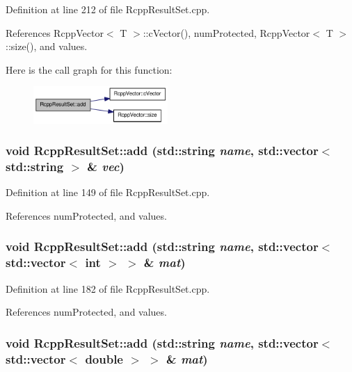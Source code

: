 Definition at line 212 of file RcppResultSet.cpp.

References RcppVector$<$ T $>$::cVector(), numProtected, RcppVector$<$ T $>$::size(), and values.

Here is the call graph for this function:\nopagebreak
\begin{figure}[H]
\begin{center}
\leavevmode
\includegraphics[width=145pt]{classRcppResultSet_a068cb13e27c0e26dd05e92d67eaeb7d0_cgraph}
\end{center}
\end{figure}
\hypertarget{classRcppResultSet_adb4236a049c8dceb7112229f5e68a295}{
\subsubsection[{add}]{\setlength{\rightskip}{0pt plus 5cm}void RcppResultSet::add (std::string {\em name}, \/  std::vector$<$ std::string $>$ \& {\em vec})}}
\label{classRcppResultSet_adb4236a049c8dceb7112229f5e68a295}


Definition at line 149 of file RcppResultSet.cpp.

References numProtected, and values.\hypertarget{classRcppResultSet_ab51f30f4bd5f3c6153221a3bd7bb7e24}{
\subsubsection[{add}]{\setlength{\rightskip}{0pt plus 5cm}void RcppResultSet::add (std::string {\em name}, \/  std::vector$<$ std::vector$<$ int $>$ $>$ \& {\em mat})}}
\label{classRcppResultSet_ab51f30f4bd5f3c6153221a3bd7bb7e24}


Definition at line 182 of file RcppResultSet.cpp.

References numProtected, and values.\hypertarget{classRcppResultSet_ab10cd8503c12708e27068b92a83e4047}{
\subsubsection[{add}]{\setlength{\rightskip}{0pt plus 5cm}void RcppResultSet::add (std::string {\em name}, \/  std::vector$<$ std::vector$<$ double $>$ $>$ \& {\em mat})}}
\label{classRcppResultSet_ab10cd8503c12708e27068b92a83e4047}


